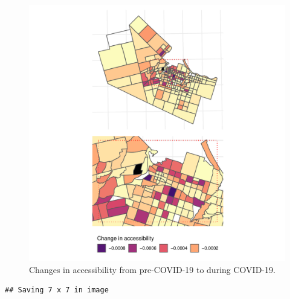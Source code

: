 \documentclass[]{elsarticle} %
\begin{document}
\begin{figure}

{\centering \includegraphics[width=1\linewidth]{Accessibility-Foodbanks-Hamilton_files/figure-latex/plot-accessibility-changes-1} 

}

\caption{\label{fig:accessibility-changes}Changes in accessibility from pre-COVID-19 to during COVID-19.}\label{fig:plot-accessibility-changes}
\end{figure}

\begin{verbatim}
## Saving 7 x 7 in image
\end{verbatim}
\end{document}
